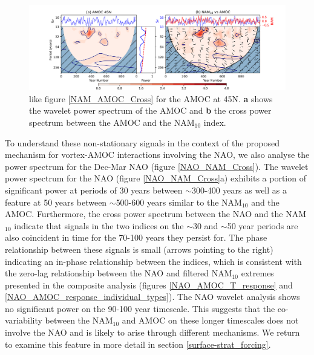 \begin{center}
\begin{figure}[h!]
\noindent\includegraphics[width = \linewidth]{Figures/Figures-surface/AMOC_NAM_filtered_subplot_45N.png}
\caption[Wavelet power spectrum of the AMOC at 45N and cross spectrum with the NAM$_{10}$ index]{like figure \ref{NAM_AMOC_Cross} for the AMOC at 45N. \textbf{a} shows the wavelet power spectrum of the AMOC and \textbf{b} the cross power spectrum between the AMOC and the NAM$_{10}$ index.}
\label{NAM_AMOC_Cross_45}
\end{figure}
\end{center}
  
To understand these non-stationary signals in the context of the proposed mechanism for vortex-AMOC interactions involving the NAO, we also analyse the power spectrum for the Dec-Mar NAO (figure \ref{NAO_NAM_Cross}). The wavelet power spectrum for the NAO (figure \ref{NAO_NAM_Cross}a) exhibits a portion of significant power at periods of 30 years between $\sim$300-400 years as well as a feature at 50 years between $\sim$500-600 years similar to the NAM$_{10}$ and the AMOC. Furthermore, the cross power spectrum between the NAO and the NAM$_{10}$ indicate that signals in the two indices on the $\sim$30 and $\sim$50 year periods are also coincident in time for the 70-100 years they persist for. The phase relationship between these signals is small (arrows pointing to the right) indicating an in-phase relationship between the indices, which is consistent with the zero-lag relationship between the NAO and filtered NAM$_{10}$ extremes presented in the composite analysis (figures \ref{NAO_AMOC_T_response} and \ref{NAO_AMOC_response_individual_types}). The NAO wavelet analysis shows no significant power on the 90-100 year timescale. This suggests that the co-variability between the NAM$_{10}$ and AMOC on these longer timescales does not involve the NAO and is likely to arise through different mechanisms. We return to examine this feature in more detail in section \ref{surface-strat_forcing}.

